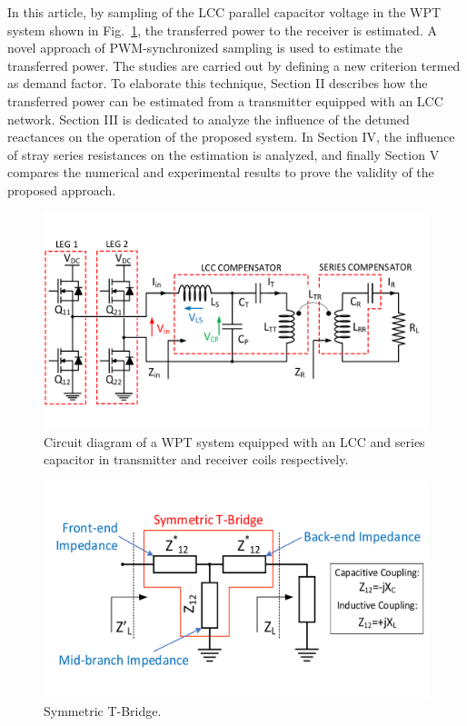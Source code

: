 \documentclass[journal,a4paper]{IEEEtran}
\begin{document}
In this article, by sampling of the LCC parallel capacitor voltage in the WPT system shown in Fig.~\ref{Fig.Fig2}, the transferred power to the receiver is estimated. A novel approach of PWM-synchronized sampling is used to estimate the transferred power. The studies are carried out by defining a new criterion termed as demand factor. To elaborate this technique, Section II describes how the transferred power can be estimated from a transmitter equipped with an LCC network. Section III is dedicated to analyze the influence of the detuned reactances on the operation of the proposed system. In Section IV, the influence of stray series resistances on the estimation is analyzed, and finally Section V compares the numerical and experimental results to prove the validity of the proposed approach.
\begin{figure}[t]
\centerline{\includegraphics[clip, trim=0cm 2cm 0cm 2cm, width=1\columnwidth]{Figs/Fig2.pdf}}
\caption{Circuit diagram of a WPT system equipped with an LCC and series capacitor in transmitter and receiver coils respectively.}
\vspace{-3mm}
\label{Fig.Fig2}
\end{figure}
\begin{figure}[t]
	\centerline{\includegraphics[clip, trim=0cm 1cm 0cm 1cm, width=0.8\columnwidth]{Figs/Fig3.pdf}}
	\vspace{-3mm}
	\caption{Symmetric T-Bridge.}
	\label{Fig.Fig3}
	\vspace{-3mm}
\end{figure}
\end{document}
